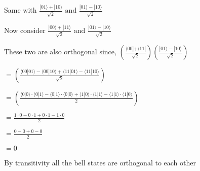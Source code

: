 \documentclass{article}
\newcommand{\0}{{$|0\rangle$}}
\newcommand{\1}{{$|1\rangle$}}
\begin{document}
Same with 
$\frac{|01\rangle + |10\rangle}{\sqrt{2}} \text{ and }
\frac{|01\rangle - |10\rangle}{\sqrt{2}}$

Now consider 
$\frac{|00\rangle + |11\rangle}{\sqrt{2}} \text{ and }
\frac{|01\rangle - |10\rangle}{\sqrt{2}}$

These two are also orthogonal since,
$(\frac{\langle00|+ \langle11|}{\sqrt{2}}) 
(\frac{|01\rangle - |10\rangle}{\sqrt{2}})$

$ = (\frac{\langle00|01\rangle - \langle00|10\rangle +  \langle11|01\rangle - \langle11|10\rangle}{\sqrt{2}})$

$ = (\frac{\langle0|0\rangle \cdot \langle0|1\rangle - \langle0|1\rangle \cdot \langle0|0\rangle + \langle1|0\rangle \cdot \langle1|1\rangle  - \langle1|1\rangle \cdot \langle1|0\rangle }{2}) $

$ = \frac{1\cdot0 - 0\cdot1 + 0\cdot1 - 1\cdot0}{2}$

$ = \frac{0 - 0 + 0 - 0}{2}$

$= 0$

By transitivity all the bell states are orthogonal to each other
\end{document}
